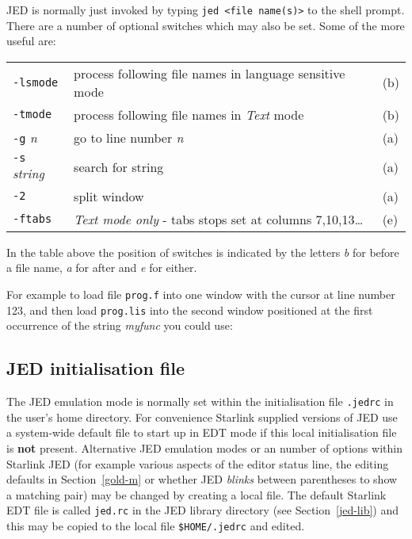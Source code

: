 \documentclass[twoside,11pt]{starlink}
\begin{document}
JED is normally just invoked by typing \texttt{jed <file name(s)>} to
the shell prompt. There are a number of optional switches which may
also be set. Some of the more useful are:
\begin{center}
\begin{tabular}{lll}
\texttt{-lsmode} & process following file names in language sensitive mode & (b)\\
\texttt{-tmode} & process following file names in \textit{Text} mode & (b)\\
\texttt{-g} \textit{n} & go to line number \textit{n} & (a)\\
\texttt{-s} \textit{string} & search for string & (a)\\
\texttt{-2} & split window & (a)\\
\texttt{-ftabs} & \textit{Text mode only} - tabs stops set at columns 7,10,13\ldots & (e)\\
\end{tabular}
\end{center}

In the table above the position of switches is indicated by the letters
\textit{b} for before a file name, \textit{a} for after and \textit{e} for
either.

For example to load file \texttt{prog.f} into one window with the cursor at
line number 123, and then load \texttt{prog.lis} into the second window
positioned at the first occurrence of the string \textit{myfunc} you could
use:
\begin{terminalv}
\end{terminalv}

\subsection{JED initialisation file}
\label{jed_initialisation_file}

The JED emulation mode is normally set within the initialisation file
\texttt{.jedrc} in the user's home directory. For convenience Starlink
supplied versions of JED use a system-wide default file to start up in EDT
mode if this local initialisation file is \textbf{not} present.
Alternative JED emulation modes
or an number of options within Starlink JED (for example various
aspects of the editor status line, the editing defaults in
Section~{\ref{gold-m}} or whether JED \textit{blinks} between
parentheses to show a matching pair) may be changed by creating a
local file. The default Starlink EDT file is called
\label{default-jedrc}
\texttt{jed.rc} in the JED library directory (see
Section~{\ref{jed-lib}}) and this may be copied to the local file
\texttt{\$HOME/.jedrc} and edited.
\end{document}
